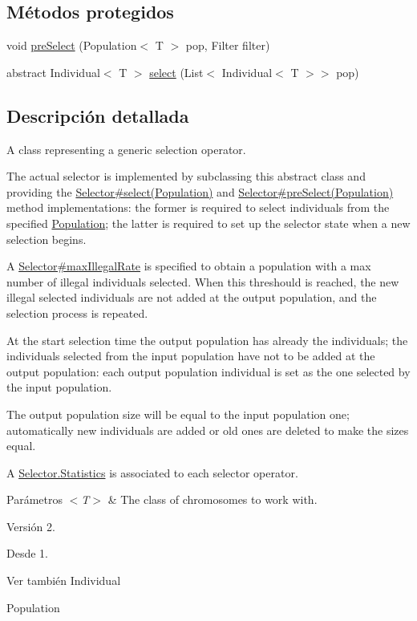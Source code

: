 \subsection*{Métodos protegidos}
\begin{DoxyCompactItemize}
\item 
void \hyperlink{classjenes_1_1stage_1_1operator_1_1_selector_3_01_t_01extends_01_chromosome_01_4_a752bf2650cbb6760d2fbb68718d62328}{pre\-Select} (Population$<$ T $>$ pop, Filter filter)
\item 
abstract Individual$<$ T $>$ \hyperlink{classjenes_1_1stage_1_1operator_1_1_selector_3_01_t_01extends_01_chromosome_01_4_af6cf22a6d6e70ffd74ee1f042a16dcd9}{select} (List$<$ Individual$<$ T $>$$>$ pop)
\end{DoxyCompactItemize}


\subsection{Descripción detallada}
A class representing a generic selection operator. 

The actual selector is implemented by subclassing this abstract class and providing the \hyperlink{}{Selector\#select(\-Population)} and \hyperlink{}{Selector\#pre\-Select(\-Population)} method implementations\-: the former is required to select individuals from the specified \hyperlink{}{Population}; the latter is required to set up the selector state when a new selection begins. 

A \hyperlink{}{Selector\#max\-Illegal\-Rate} is specified to obtain a population with a max number of illegal individuals selected. When this threshould is reached, the new illegal selected individuals are not added at the output population, and the selection process is repeated. 

At the start selection time the output population has already the individuals; the individuals selected from the input population have not to be added at the output population\-: each output population individual is set as the one selected by the input population. 

The output population size will be equal to the input population one; automatically new individuals are added or old ones are deleted to make the sizes equal. 

A \hyperlink{}{Selector.\-Statistics} is associated to each selector operator.


\begin{DoxyParams}{Parámetros}
{\em $<$\-T$>$} & The class of chromosomes to work with.\\
\hline
\end{DoxyParams}
\begin{DoxyVersion}{Versión}
2. 
\end{DoxyVersion}
\begin{DoxySince}{Desde}
1.
\end{DoxySince}
\begin{DoxySeeAlso}{Ver también}
Individual 

Population 
\end{DoxySeeAlso}


